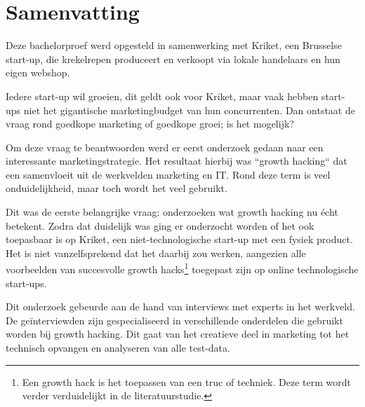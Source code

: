 
%
%


\chapter*{Samenvatting}

Deze bachelorproef werd opgesteld in samenwerking met Kriket, een Brusselse start-up, die krekelrepen produceert en verkoopt via lokale handelaars en hun eigen webshop. 

Iedere start-up wil groeien, dit geldt ook voor Kriket, maar vaak hebben start-ups niet het gigantische marketingbudget van hun concurrenten. Dan ontstaat de vraag rond goedkope marketing of goedkope groei; is het mogelijk?

Om deze vraag te beantwoorden werd er eerst onderzoek gedaan naar een interessante marketingstrategie. Het resultaat hierbij was ``growth hacking`` dat een samenvloeit uit de werkvelden marketing en IT. Rond deze term is veel onduidelijkheid, maar toch wordt het veel gebruikt.

Dit was de eerste belangrijke vraag: onderzoeken wat growth hacking nu écht betekent. Zodra dat duidelijk was ging er onderzocht worden of het ook toepasbaar is op Kriket, een niet-technologische start-up met een fysiek product. Het is niet vanzelfsprekend dat het daarbij zou werken, aangezien alle voorbeelden van succesvolle growth hacks\footnote{Een growth hack is het toepassen van een truc of techniek. Deze term wordt verder verduidelijkt in de literatuurstudie.} toegepast zijn op online technologische start-ups.

Dit onderzoek gebeurde aan de hand van interviews met experts in het werkveld. De geïnterviewden zijn gespecialiseerd in verschillende onderdelen die gebruikt worden bij growth hacking. Dit gaat van het creatieve deel in marketing tot het technisch opvangen en analyseren van alle test-data. 

